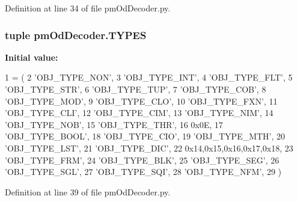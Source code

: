 Definition at line 34 of file pm\-Od\-Decoder.\-py.

\hypertarget{namespacepm_od_decoder_acf0627a14f0a1c31c5fd905f256b5969}{
\subsubsection[{T\-Y\-P\-E\-S}]{\setlength{\rightskip}{0pt plus 5cm}tuple pm\-Od\-Decoder.\-T\-Y\-P\-E\-S}}\label{namespacepm_od_decoder_acf0627a14f0a1c31c5fd905f256b5969}
{\bfseries Initial value\-:}
\begin{DoxyCode}
1 = (
2     \textcolor{stringliteral}{'OBJ\_TYPE\_NON'},
3     \textcolor{stringliteral}{'OBJ\_TYPE\_INT'},
4     \textcolor{stringliteral}{'OBJ\_TYPE\_FLT'},
5     \textcolor{stringliteral}{'OBJ\_TYPE\_STR'},
6     \textcolor{stringliteral}{'OBJ\_TYPE\_TUP'},
7     \textcolor{stringliteral}{'OBJ\_TYPE\_COB'},
8     \textcolor{stringliteral}{'OBJ\_TYPE\_MOD'},
9     \textcolor{stringliteral}{'OBJ\_TYPE\_CLO'},
10     \textcolor{stringliteral}{'OBJ\_TYPE\_FXN'},
11     \textcolor{stringliteral}{'OBJ\_TYPE\_CLI'},
12     \textcolor{stringliteral}{'OBJ\_TYPE\_CIM'},
13     \textcolor{stringliteral}{'OBJ\_TYPE\_NIM'},
14     \textcolor{stringliteral}{'OBJ\_TYPE\_NOB'},
15     \textcolor{stringliteral}{'OBJ\_TYPE\_THR'},
16     0x0E,
17     \textcolor{stringliteral}{'OBJ\_TYPE\_BOOL'},
18     \textcolor{stringliteral}{'OBJ\_TYPE\_CIO'},
19     \textcolor{stringliteral}{'OBJ\_TYPE\_MTH'},
20     \textcolor{stringliteral}{'OBJ\_TYPE\_LST'},
21     \textcolor{stringliteral}{'OBJ\_TYPE\_DIC'},
22     0x14,0x15,0x16,0x17,0x18,
23     \textcolor{stringliteral}{'OBJ\_TYPE\_FRM'},
24     \textcolor{stringliteral}{'OBJ\_TYPE\_BLK'},
25     \textcolor{stringliteral}{'OBJ\_TYPE\_SEG'},
26     \textcolor{stringliteral}{'OBJ\_TYPE\_SGL'},
27     \textcolor{stringliteral}{'OBJ\_TYPE\_SQI'},
28     \textcolor{stringliteral}{'OBJ\_TYPE\_NFM'},
29 )
\end{DoxyCode}


Definition at line 39 of file pm\-Od\-Decoder.\-py.

